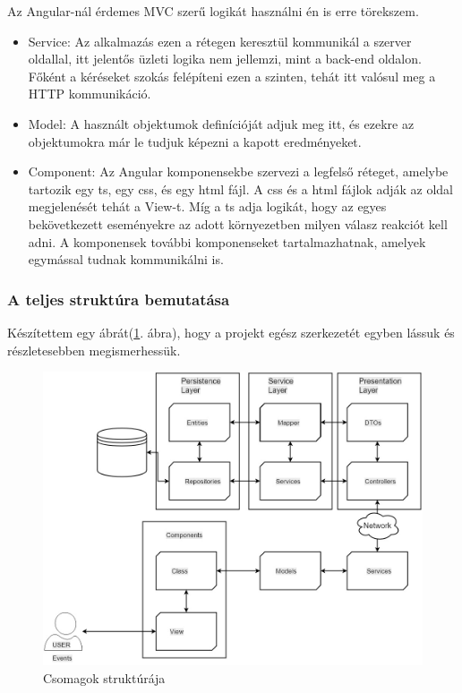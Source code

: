 Az Angular-nál érdemes MVC szerű logikát használni én is erre törekszem. 

\begin{itemize}

\item Service: Az alkalmazás ezen a rétegen keresztül kommunikál a szerver oldallal, itt jelentős üzleti logika nem jellemzi, mint a back-end oldalon. Főként a kéréseket szokás felépíteni ezen a szinten, tehát itt valósul meg a HTTP kommunikáció.

\item Model: A használt objektumok definícióját adjuk meg itt, és ezekre az objektumokra már le tudjuk képezni a kapott eredményeket.

\item Component:  Az Angular komponensekbe szervezi a legfelső réteget, amelybe tartozik egy ts, egy css, és egy html fájl. A css és a html fájlok adják az oldal megjelenését tehát a View-t. Míg a ts adja logikát, hogy az egyes bekövetkezett eseményekre az adott környezetben milyen válasz reakciót kell adni. A komponensek további komponenseket tartalmazhatnak, amelyek egymással tudnak kommunikálni is.

\end{itemize}

\subsubsection{A teljes struktúra bemutatása}
Készítettem egy ábrát(\ref{fig:mvc}. ábra), hogy a projekt egész szerkezetét egyben lássuk és részletesebben megismerhessük.

\begin{figure}
\centering
\includegraphics[scale=0.47]{kepek/mvc_arch.jpg}
\caption{Csomagok struktúrája}
\label{fig:mvc}
\end{figure}

